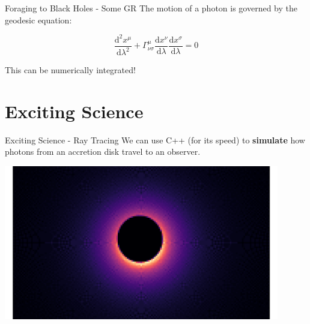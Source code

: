 \documentclass{beamer}
\begin{document}
\begin{frame}{Foraging to Black Holes - Some GR}
    The motion of a photon is governed by the geodesic equation:

    \vspace{0.5cm}

    \begin{equation*}
        \frac{\mathrm{d}^{2}x^{\mu}}{\mathrm{d}\lambda^{2}} + \Gamma^{\mu}_{\nu\sigma}\frac{\mathrm{d}x^{\nu}}{\mathrm{d}\lambda}\frac{\mathrm{d}x^{\sigma}}{\mathrm{d}\lambda} = 0
    \end{equation*}

    \vspace{0.5cm}

    This can be numerically integrated!
\end{frame}


\section{Exciting Science}


\begin{frame}{Exciting Science - Ray Tracing}
    We can use C++ (for its speed) to \textbf{simulate} how photons from an accretion disk travel to an observer.

    \vspace{0.5cm}

    \centering
    \includegraphics[width=0.90\textwidth]{asset/bh_alt.png}

\end{frame}
\end{document}
